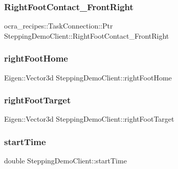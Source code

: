 \subsubsection{\texorpdfstring{Right\+Foot\+Contact\+\_\+\+Front\+Right}{RightFootContact\_FrontRight}}
{\footnotesize\ttfamily ocra\+\_\+recipes\+::\+Task\+Connection\+::\+Ptr Stepping\+Demo\+Client\+::\+Right\+Foot\+Contact\+\_\+\+Front\+Right\hspace{0.3cm}{\ttfamily [private]}}

\hypertarget{classSteppingDemoClient_ae2a3bdaafc7784b5afece8ae9ebaff7d}{}\label{classSteppingDemoClient_ae2a3bdaafc7784b5afece8ae9ebaff7d} 
\subsubsection{\texorpdfstring{right\+Foot\+Home}{rightFootHome}}
{\footnotesize\ttfamily Eigen\+::\+Vector3d Stepping\+Demo\+Client\+::right\+Foot\+Home\hspace{0.3cm}{\ttfamily [private]}}

\hypertarget{classSteppingDemoClient_abfe6635a0ad50fa4baa6fa10b8c56d9e}{}\label{classSteppingDemoClient_abfe6635a0ad50fa4baa6fa10b8c56d9e} 
\subsubsection{\texorpdfstring{right\+Foot\+Target}{rightFootTarget}}
{\footnotesize\ttfamily Eigen\+::\+Vector3d Stepping\+Demo\+Client\+::right\+Foot\+Target\hspace{0.3cm}{\ttfamily [private]}}

\hypertarget{classSteppingDemoClient_af7b6e48319ef9d35fb975edc3bb2a137}{}\label{classSteppingDemoClient_af7b6e48319ef9d35fb975edc3bb2a137} 
\subsubsection{\texorpdfstring{start\+Time}{startTime}}
{\footnotesize\ttfamily double Stepping\+Demo\+Client\+::start\+Time\hspace{0.3cm}{\ttfamily [private]}}



